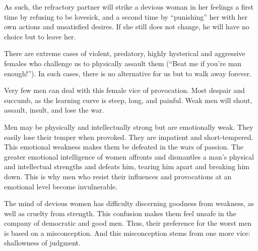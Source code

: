 
\par As such, the refractory partner will strike a devious woman in her feelings a first time by refusing to be lovesick, and a second time by \enquote{punishing} her with her own actions and unsatisfied desires. If she still does not change, he will have no choice but to leave her.

\par There are extreme cases of violent, predatory, highly hysterical and aggressive females who challenge us to physically assault them (\enquote{Beat me if you're man enough!}). In such cases, there is no alternative for us but to walk away forever.

\par Very few men can deal with this female vice of provocation. Most despair and succumb, as the learning curve is steep, long, and painful. Weak men will shout, assault, insult, and lose the war.

\par Men may be physically and intellectually strong but are emotionally weak. They easily lose their temper when provoked. They are impatient and short-tempered. This emotional weakness makes them be defeated in the wars of passion. The greater emotional intelligence of women affronts and dismantles a man's physical and intellectual strengths and defeats him, tearing him apart and breaking him down. This is why men who resist their influences and provocations at an emotional level become invulnerable.

\par The mind of devious women has difficulty discerning goodness from weakness, as well as cruelty from strength. This confusion makes them feel unsafe in the company of democratic and good men. Thus, their preference for the worst men is based on a misconception. And this misconception stems from one more vice: shallowness of judgment.